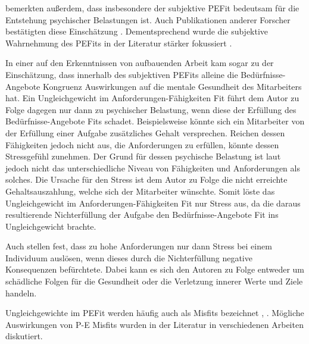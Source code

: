 \textcite[S. 4]{copingAndAdaption:1974} bemerkten außerdem, dass insbesondere der subjektive \ac{PEFit} bedeutsam für die Entstehung psychischer Belastungen ist. Auch Publikationen anderer Forscher bestätigten diese Einschätzung \cite[S. 3]{carless:2005}. Dementsprechend wurde die subjektive Wahrnehmung des \acp{PEFit} in der Literatur stärker fokussiert \cite[S. 8]{caplan:1987}\cite[S. 9]{caplan:1993}\cite[S. 16]{choi:2004}.

In einer auf den Erkenntnissen von \textcite[S. 1ff.]{copingAndAdaption:1974} aufbauenden Arbeit kam \textcite[S. 5ff.]{harrison:1978} sogar zu der Einschätzung, dass innerhalb des subjektiven \acp{PEFit} alleine die Bedürfnisse-Angebote Kongruenz Auswirkungen auf die mentale Gesundheit des Mitarbeiters hat. Ein Ungleichgewicht im Anforderungen-Fähigkeiten Fit führt dem Autor zu Folge dagegen nur dann zu psychischer Belastung, wenn diese der Erfüllung des Bedürfnisse-Angebote Fits schadet. Beispielsweise könnte sich ein Mitarbeiter von der Erfüllung einer Aufgabe zusätzliches Gehalt versprechen. Reichen dessen Fähigkeiten jedoch nicht aus, die Anforderungen zu erfüllen, könnte dessen Stressgefühl zunehmen. Der Grund für dessen psychische Belastung ist laut \textcite[S. 13]{harrison:1978} jedoch nicht das unterschiedliche Niveau von Fähigkeiten und Anforderungen als solches. Die Ursache für den Stress ist dem Autor zu Folge die nicht erreichte Gehaltsauszahlung, welche sich der Mitarbeiter wünschte. Somit löste das Ungleichgewicht im Anforderungen-Fähigkeiten Fit nur Stress aus, da die daraus resultierende Nichterfüllung der Aufgabe den Bedürfnisse-Angebote Fit ins Ungleichgewicht brachte.

Auch \textcite[S. 1ff.]{lazarus:1978} stellen fest, dass zu hohe Anforderungen nur dann Stress bei einem Individuum auslösen, wenn dieses durch die Nichterfüllung negative Konsequenzen befürchtete. Dabei kann es sich den Autoren zu Folge entweder um schädliche Folgen für die Gesundheit oder die Verletzung innerer Werte und Ziele handeln.

Ungleichgewichte im \ac{PEFit} werden häufig auch als Misfits bezeichnet \cite[S. 2]{edwards:2004}, \cite[S. 4]{kristof:1996}. Mögliche Auswirkungen von P-E Misfits wurden in der Literatur in verschiedenen Arbeiten diskutiert.

